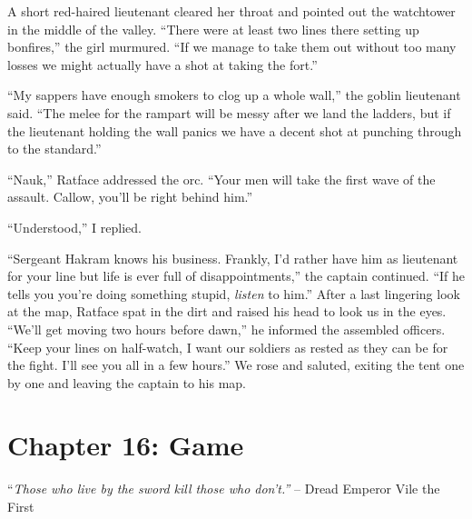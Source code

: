 \documentclass[12pt, openany]{book}
\begin{document}
A short red-haired lieutenant cleared her throat and pointed out the watchtower in the middle of the valley. “There were at least two lines there setting up bonfires,” the girl murmured. “If we manage to take them out without too many losses we might actually have a shot at taking the fort.”

“My sappers have enough smokers to clog up a whole wall,” the goblin lieutenant said. “The melee for the rampart will be messy after we land the ladders, but if the lieutenant holding the wall panics we have a decent shot at punching through to the standard.”

“Nauk,” Ratface addressed the orc. “Your men will take the first wave of the assault. Callow, you’ll be right behind him.”

“Understood,” I replied.

“Sergeant Hakram knows his business. Frankly, I’d rather have him as lieutenant for your line but life is ever full of disappointments,” the captain continued. “If he tells you you’re doing something stupid, \textit{listen} to him.” After a last lingering look at the map, Ratface spat in the dirt and raised his head to look us in the eyes. “We’ll get moving two hours before dawn,” he informed the assembled officers. “Keep your lines on half-watch, I want our soldiers as rested as they can be for the fight. I’ll see you all in a few hours.” We rose and saluted, exiting the tent one by one and leaving the captain to his map.
\clearpage
\chapter{Chapter 16: Game}

“\textit{Those who live by the sword kill those who don’t.”}
– Dread Emperor Vile the First
\end{document}
